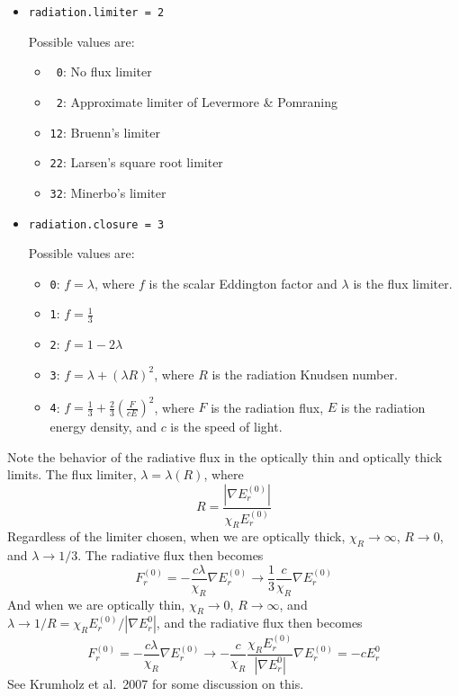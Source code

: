 \begin{itemize}

\item {\tt radiation.limiter = 2}

  Possible values are:
  \begin{itemize}
  \item {\tt ~0}: No flux limiter

  \item {\tt ~2}: Approximate limiter of Levermore \& Pomraning

  \item {\tt 12}: Bruenn's limiter

  \item {\tt 22}: Larsen's square root limiter

  \item {\tt 32}: Minerbo's limiter
  \end{itemize}

\item {\tt radiation.closure = 3}

  Possible values are:
  \begin{itemize}
  \item {\tt 0}: $f = \lambda$, where $f$ is the scalar Eddington factor
    and $\lambda$ is the flux limiter.

  \item {\tt 1}: $f = \frac{1}{3}$
  \item {\tt 2}: $f = 1 - 2 \lambda$
  \item {\tt 3}: $f = \lambda + (\lambda R)^2$, where $R$ is the radiation
    Knudsen number.
  \item {\tt 4}: $f = \frac{1}{3} + \frac{2}{3} (\frac{F}{cE})^2$, where
      $F$ is the radiation flux, $E$ is the radiation energy density,
      and $c$ is the speed of light.
  \end{itemize}
\end{itemize}

Note the behavior of the radiative flux in the optically thin and
optically thick limits.  The flux limiter, $\lambda = \lambda(R)$,
where
\begin{equation}
  R = \frac{|\nabla E_r^{(0)}|}{\chi_R E_r^{(0)}}
\end{equation}
Regardless of the limiter chosen, when we are optically thick,
$\chi_R \rightarrow \infty$, $R \rightarrow 0$, and $\lambda \rightarrow 1/3$.
The radiative flux then becomes
\begin{equation}
  F_r^{(0)} = -\frac{c\lambda}{\chi_R} \nabla E_r^{(0)} \rightarrow
  \frac{1}{3} \frac{c}{\chi_R} \nabla E_r^{(0)}
\end{equation}
And when we are optically thin, $\chi_R \rightarrow 0$, $R \rightarrow \infty$,
and $\lambda \rightarrow 1/R = \chi_R E_r^{(0)}/{|\nabla E_r^{0}|}$, and
the radiative flux then becomes
\begin{equation}
  F_r^{(0)} = -\frac{c\lambda}{\chi_R} \nabla E_r^{(0)} \rightarrow
  -\frac{c}{\chi_R}\frac{\chi_R E_r^{(0)}}{|\nabla E_r^{0}|}
    \nabla E_r^{(0)} = -c E_r^{0}
\end{equation}
See Krumholz et al.\ 2007 for some discussion on this.
